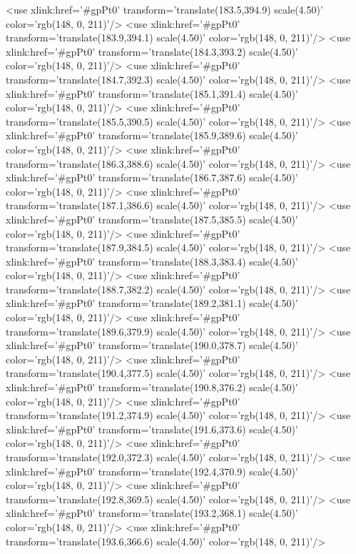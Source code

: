 	<use xlink:href='#gpPt0' transform='translate(183.5,394.9) scale(4.50)' color='rgb(148,   0, 211)'/>
	<use xlink:href='#gpPt0' transform='translate(183.9,394.1) scale(4.50)' color='rgb(148,   0, 211)'/>
	<use xlink:href='#gpPt0' transform='translate(184.3,393.2) scale(4.50)' color='rgb(148,   0, 211)'/>
	<use xlink:href='#gpPt0' transform='translate(184.7,392.3) scale(4.50)' color='rgb(148,   0, 211)'/>
	<use xlink:href='#gpPt0' transform='translate(185.1,391.4) scale(4.50)' color='rgb(148,   0, 211)'/>
	<use xlink:href='#gpPt0' transform='translate(185.5,390.5) scale(4.50)' color='rgb(148,   0, 211)'/>
	<use xlink:href='#gpPt0' transform='translate(185.9,389.6) scale(4.50)' color='rgb(148,   0, 211)'/>
	<use xlink:href='#gpPt0' transform='translate(186.3,388.6) scale(4.50)' color='rgb(148,   0, 211)'/>
	<use xlink:href='#gpPt0' transform='translate(186.7,387.6) scale(4.50)' color='rgb(148,   0, 211)'/>
	<use xlink:href='#gpPt0' transform='translate(187.1,386.6) scale(4.50)' color='rgb(148,   0, 211)'/>
	<use xlink:href='#gpPt0' transform='translate(187.5,385.5) scale(4.50)' color='rgb(148,   0, 211)'/>
	<use xlink:href='#gpPt0' transform='translate(187.9,384.5) scale(4.50)' color='rgb(148,   0, 211)'/>
	<use xlink:href='#gpPt0' transform='translate(188.3,383.4) scale(4.50)' color='rgb(148,   0, 211)'/>
	<use xlink:href='#gpPt0' transform='translate(188.7,382.2) scale(4.50)' color='rgb(148,   0, 211)'/>
	<use xlink:href='#gpPt0' transform='translate(189.2,381.1) scale(4.50)' color='rgb(148,   0, 211)'/>
	<use xlink:href='#gpPt0' transform='translate(189.6,379.9) scale(4.50)' color='rgb(148,   0, 211)'/>
	<use xlink:href='#gpPt0' transform='translate(190.0,378.7) scale(4.50)' color='rgb(148,   0, 211)'/>
	<use xlink:href='#gpPt0' transform='translate(190.4,377.5) scale(4.50)' color='rgb(148,   0, 211)'/>
	<use xlink:href='#gpPt0' transform='translate(190.8,376.2) scale(4.50)' color='rgb(148,   0, 211)'/>
	<use xlink:href='#gpPt0' transform='translate(191.2,374.9) scale(4.50)' color='rgb(148,   0, 211)'/>
	<use xlink:href='#gpPt0' transform='translate(191.6,373.6) scale(4.50)' color='rgb(148,   0, 211)'/>
	<use xlink:href='#gpPt0' transform='translate(192.0,372.3) scale(4.50)' color='rgb(148,   0, 211)'/>
	<use xlink:href='#gpPt0' transform='translate(192.4,370.9) scale(4.50)' color='rgb(148,   0, 211)'/>
	<use xlink:href='#gpPt0' transform='translate(192.8,369.5) scale(4.50)' color='rgb(148,   0, 211)'/>
	<use xlink:href='#gpPt0' transform='translate(193.2,368.1) scale(4.50)' color='rgb(148,   0, 211)'/>
	<use xlink:href='#gpPt0' transform='translate(193.6,366.6) scale(4.50)' color='rgb(148,   0, 211)'/>
